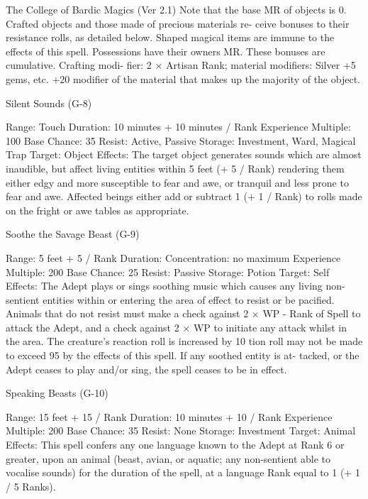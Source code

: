 \begin{Chapter}{The College of Bardic Magics (Ver 2.1)}
Note  that  the  base  MR  of  objects  is  0.  Crafted 
objects  and  those  made  of  precious  materials  re-
ceive  bonuses  to  their  resistance  rolls,  as  detailed 
below.  Shaped  magical  items  are  immune  to  the 
effects of this spell. Possessions have their owners 
MR. These bonuses are cumulative. Crafting modi-
fier:  2  ×  Artisan  Rank;  material  modifiers:  Silver 
+5%
gems,  etc.  +20%
modifier of the material that makes up the majority 
of the object. 

Silent Sounds (G-8) 

Range: Touch 
Duration: 10 minutes + 10 minutes / Rank 
Experience Multiple: 100 
Base Chance: 35%
Resist: Active, Passive 
Storage: Investment, Ward, Magical Trap 
Target: Object 
Effects:  The  target  object  generates  sounds  which 
are  almost  inaudible,  but  affect  living  entities 
within  5  feet  (+  5  /  Rank)  rendering  them  either 
edgy  and  more  susceptible  to  fear  and  awe,  or 
tranquil  and  less  prone  to  fear  and  awe.  Affected 
beings either add or subtract 1 (+ 1 / Rank) to rolls 
made on the fright or awe tables as appropriate. 

Soothe the Savage Beast (G-9) 

Range: 5 feet + 5 / Rank 
Duration: Concentration: no maximum 
Experience Multiple: 200 
Base Chance: 25%
Resist: Passive 
Storage: Potion 
Target: Self 
Effects:  The  Adept  plays  or  sings  soothing  music 
which  causes  any  living  non-sentient  entities 
within or entering the area of  effect to resist or be 
pacified.  Animals  that  do  not  resist  must  make  a 
check against 2 × WP - Rank of Spell to attack the 
Adept, and a check against 2 × WP to initiate any 
attack  whilst  in  the  area.  The  creature’s  reaction 
roll is increased by 10%
tion  roll  may  not  be  made  to  exceed  95  by  the 
effects  of  this  spell.  If  any  soothed  entity  is  at-
tacked, or the Adept ceases to play and/or sing, the 
spell ceases to be in effect. 

Speaking Beasts (G-10) 

Range: 15 feet + 15 / Rank 
Duration: 10 minutes + 10 / Rank 
Experience Multiple: 200 
Base Chance: 35%
Resist: None 
Storage: Investment 
Target: Animal 
Effects: This spell confers any one language known 
to the Adept at Rank 6 or greater, upon an animal 
(beast,  avian,  or  aquatic;  any  non-sentient  able  to 
vocalise  sounds)  for  the  duration  of  the  spell,  at  a 
language Rank equal to 1 (+ 1 / 5 Ranks). 


\end{Chapter}
